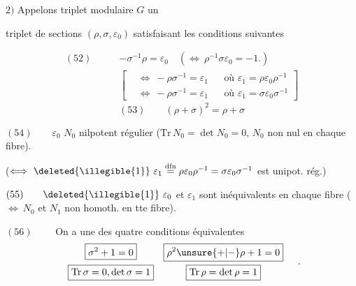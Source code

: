 $2)$ Appelons triplet modulaire  $G$ un


triplet de sections $(\rho,\sigma,\varepsilon_0)$ satisfaisant les
 conditions suivantes

\[
\begin{aligned}
(52)\qquad &-\sigma^{-1}\rho=\varepsilon_0
\quad(\Longleftrightarrow\ \rho^{-1}\sigma\varepsilon_0=-1.)\\
&\left[\begin{aligned}
&\Longleftrightarrow\ -\rho\sigma^{-1}=\varepsilon_1
&&\text{où }\varepsilon_1=\rho\varepsilon_0\rho^{-1}\\
&\Longleftrightarrow\ -\rho\sigma^{-1}=\varepsilon_1
&&\text{où }\varepsilon_1=\sigma\varepsilon_0\sigma^{-1}
\end{aligned}\right]
\end{aligned}
\]
\[
(53)\qquad(\rho+\sigma)^2=\rho+\sigma
\]

$(54)\qquad\varepsilon_0$
$N_0$  nilpotent régulier
($\mathrm{Tr}\,N_0=\det N_0=0$, $N_0$ non nul en chaque fibre).


($\Longleftrightarrow\ \deleted{\illegible{1}}\ \varepsilon_1
\overset{\mathrm{dfn}}=\rho\varepsilon_0\rho^{-1}
=\sigma\varepsilon_0\sigma^{-1}$ est unipot. rég.)

$(55)\qquad\deleted{\illegible{1}}\ \varepsilon_0$ et $\varepsilon_1$ sont
inéquivalents en chaque fibre
($\Longleftrightarrow\ N_0$ et $N_1$ non homoth. en tte fibre).

$(56)\qquad$ On a une des quatre conditions équivalentes
\[
\begin{array}{cc}
\boxed{\sigma^2+1=0}&\boxed{\rho^2\unsure{+|-}\rho+1=0}\\[6pt]
\boxed{\mathrm{Tr}\,\sigma=0,\det\sigma=1}&
\boxed{\mathrm{Tr}\,\rho=\det\rho=1}
\end{array}
\quad.
\]

